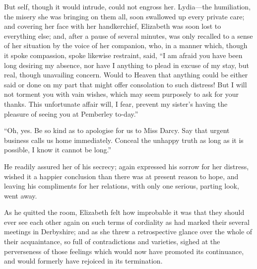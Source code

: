 \documentclass[12pt,english,oneside]{book}
\begin{document}
But self, though it would intrude, could not engross her. Lydia\mbox{---}the
humiliation, the misery she was bringing on them all, soon swallowed
up every private care; and covering her face with her handkerchief,
Elizabeth was soon lost to everything else; and, after a pause of
several minutes, was only recalled to a sense of her situation by
the voice of her companion, who, in a manner which, though it spoke
compassion, spoke likewise restraint, said, {}``I am afraid you have
been long desiring my absence, nor have I anything to plead in excuse
of my stay, but real, though unavailing concern. Would to Heaven that
anything could be either said or done on my part that might offer
consolation to such distress! But I will not torment you with vain
wishes, which may seem purposely to ask for your thanks. This unfortunate
affair will, I fear, prevent my sister's having the pleasure of seeing
you at Pemberley to-day.''

{}``Oh, yes. Be so kind as to apologise for us to Miss Darcy. Say
that urgent business calls us home immediately. Conceal the unhappy
truth as long as it is possible, I know it cannot be long.''

He readily assured her of his secrecy; again expressed his sorrow
for her distress, wished it a happier conclusion than there was at
present reason to hope, and leaving his compliments for her relations,
with only one serious, parting look, went away.

As he quitted the room, Elizabeth felt how improbable it was that
they should ever see each other again on such terms of cordiality
as had marked their several meetings in Derbyshire; and as she threw
a retrospective glance over the whole of their acquaintance, so full
of contradictions and varieties, sighed at the perverseness of those
feelings which would now have promoted its continuance, and would
formerly have rejoiced in its termination.
\end{document}
